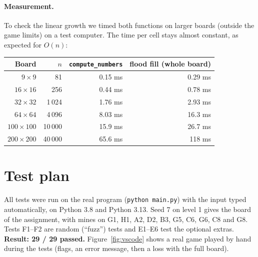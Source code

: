 \documentclass[11pt,a4paper]{article}
\newcommand{\code}[1]{\texttt{#1}}
\begin{document}
\paragraph{Measurement.} To check the linear growth we timed both functions on larger boards
(outside the game limits) on a test computer. The time per cell stays almost constant, as expected
for $O(n)$:
\begin{center}
\begin{tabular}{rrrr}
\toprule
\textbf{Board} & $n$ & \code{compute\_numbers} & flood fill (whole board)\\
\midrule
$9\times9$ & 81 & 0.15 ms & 0.29 ms\\
$16\times16$ & 256 & 0.44 ms & 0.78 ms\\
$32\times32$ & 1\,024 & 1.76 ms & 2.93 ms\\
$64\times64$ & 4\,096 & 8.03 ms & 16.3 ms\\
$100\times100$ & 10\,000 & 15.9 ms & 26.7 ms\\
$200\times200$ & 40\,000 & 65.6 ms & 118 ms\\
\bottomrule
\end{tabular}
\end{center}

\section{Test plan}

All tests were run on the real program (\code{python main.py}) with the input typed automatically,
on Python 3.8 and Python 3.13. Seed 7 on level 1 gives the board of the assignment, with mines on
G1, H1, A2, D2, B3, G5, C6, G6, C8 and G8. Tests F1--F2 are random (``fuzz'') tests and E1--E6 test the
optional extras. \textbf{Result: 29 / 29 passed.} Figure~\ref{fig:vscode} shows a real game played by
hand during the tests (flags, an error message, then a loss with the full board).
\end{document}
